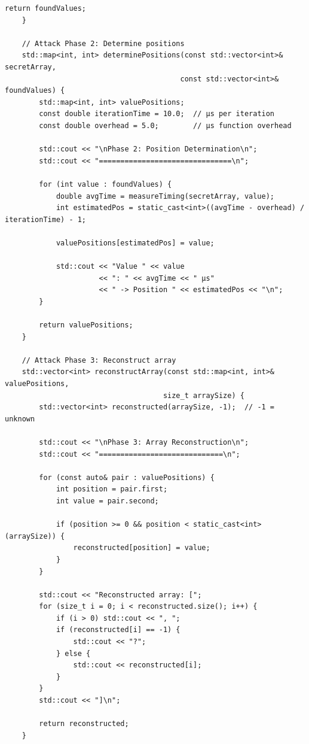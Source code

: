 \documentclass[12pt,a4paper]{article}
\theoremstyle{definition}
\begin{document}
\begin{lstlisting}[style=cryptoCode, caption={Complete Attack Implementation}]
        return foundValues;
    }
    
    // Attack Phase 2: Determine positions
    std::map<int, int> determinePositions(const std::vector<int>& secretArray,
                                         const std::vector<int>& foundValues) {
        std::map<int, int> valuePositions;
        const double iterationTime = 10.0;  // μs per iteration
        const double overhead = 5.0;        // μs function overhead
        
        std::cout << "\nPhase 2: Position Determination\n";
        std::cout << "===============================\n";
        
        for (int value : foundValues) {
            double avgTime = measureTiming(secretArray, value);
            int estimatedPos = static_cast<int>((avgTime - overhead) / iterationTime) - 1;
            
            valuePositions[estimatedPos] = value;
            
            std::cout << "Value " << value 
                      << ": " << avgTime << " μs"
                      << " -> Position " << estimatedPos << "\n";
        }
        
        return valuePositions;
    }
    
    // Attack Phase 3: Reconstruct array
    std::vector<int> reconstructArray(const std::map<int, int>& valuePositions,
                                     size_t arraySize) {
        std::vector<int> reconstructed(arraySize, -1);  // -1 = unknown
        
        std::cout << "\nPhase 3: Array Reconstruction\n";
        std::cout << "=============================\n";
        
        for (const auto& pair : valuePositions) {
            int position = pair.first;
            int value = pair.second;
            
            if (position >= 0 && position < static_cast<int>(arraySize)) {
                reconstructed[position] = value;
            }
        }
        
        std::cout << "Reconstructed array: [";
        for (size_t i = 0; i < reconstructed.size(); i++) {
            if (i > 0) std::cout << ", ";
            if (reconstructed[i] == -1) {
                std::cout << "?";
            } else {
                std::cout << reconstructed[i];
            }
        }
        std::cout << "]\n";
        
        return reconstructed;
    }
    

\end{lstlisting}
\end{document}
